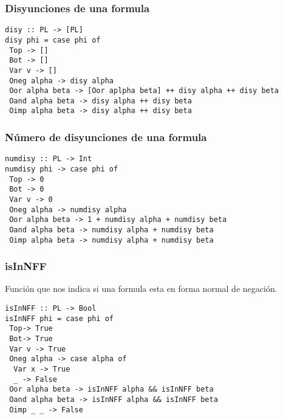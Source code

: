 \documentclass[11pt]{article}
\begin{document}
\subsubsection{Disyunciones de una formula}
\label{sec:org8f08dd5}
\begin{verbatim}
disy :: PL -> [PL]
disy phi = case phi of 
 Top -> []
 Bot -> []
 Var v -> []
 Oneg alpha -> disy alpha 
 Oor alpha beta -> [Oor aplpha beta] ++ disy alpha ++ disy beta 
 Oand alpha beta -> disy alpha ++ disy beta
 Oimp alpha beta -> disy alpha ++ disy beta
\end{verbatim}
\subsubsection{Número de disyunciones de una formula}
\label{sec:orge727a72}
\begin{verbatim}
numdisy :: PL -> Int
numdisy phi -> case phi of
 Top -> 0
 Bot -> 0
 Var v -> 0
 Oneg alpha -> numdisy alpha
 Oor alpha beta -> 1 + numdisy alpha + numdisy beta
 Oand alpha beta -> numdisy alpha + numdisy beta
 Oimp alpha beta -> numdisy alpha + numdisy beta  
\end{verbatim}
\subsubsection{isInNFF}
\label{sec:orga0235ba}
Función que nos indica si una formula esta en forma normal de negación.
\begin{verbatim}
isInNFF :: PL -> Bool
isInNFF phi = case phi of
 Top-> True
 Bot-> True
 Var v -> True
 Oneg alpha -> case alpha of
  Var x -> True
  _ -> False 
 Oor alpha beta -> isInNFF alpha && isInNFF beta
 Oand alpha beta -> isInNFF alpha && isInNFF beta
 Oimp _ _ -> False
\end{verbatim}
\end{document}
